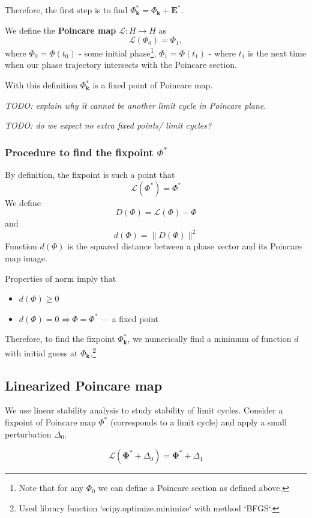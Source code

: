 \documentclass[a4paper,12pt]{article}
\newcommand{\D}{\Delta}%
\begin{document}
Therefore, the first step is to find $\Phi^*_\mathbf{k}=\Phi_\mathbf{k} + \mathbf{E}^*$.

We define the \textbf{Poincare map} $\mathcal{L}: H \rightarrow H$ as
 $$\mathcal{L}(\Phi_0) = \Phi_1,$$
where
$\Phi_0 = \Phi(t_0)$ - some initial phase\footnote{Note that for any $\Phi_0$ we can define a Poincare section as defined above.},
$\Phi_1=\Phi(t_1)$ - where $t_1$ is the next time when our phase trajectory intersects with the Poincare section.

With this definition  $\Phi^*_\mathbf{k}$ is a fixed point of Poincare map.

\textit{TODO: explain why it cannot be another limit cycle in Poincare plane. }

\textit{TODO: do we expect no extra fixed points/ limit cycles?}

\subsubsection{Procedure to find the fixpoint $\Phi^*$}

By definition, the fixpoint is such a point that
$$
\mathcal{L}(\Phi^*) = \Phi^*
$$
We define
$$
D(\Phi) = \mathcal{L}(\Phi) - \Phi
$$
and
$$
d(\Phi) = \lVert D(\Phi) \rVert ^ 2
$$
Function $d(\Phi)$ is the squared distance between a phase vector and its Poincare map image.

Properties of norm imply that
\begin{itemize}
\item $d(\Phi) \geq 0$
\item $d(\Phi)=0 \iff \Phi = \Phi^*$ --- a fixed point

\end{itemize}
Therefore, to find the fixpoint $\Phi^*_{\mathbf{k}}$, we numerically find a minimum of function $d$ with initial guess at $\Phi_{\mathbf{k}}$.\footnote{Used library function `scipy.optimize.minimize` with method `BFGS`.}


\subsection{ Linearized Poincare map}

We use linear stability analysis to study stability of limit cycles. Consider a fixpoint of Poincare map $\Phi^*$ (corresponds to a limit cycle) and apply a small perturbation $\D_0$.

$$\mathcal{L}(\mathbf{\Phi^{*}} + \D_0) = \mathbf{\Phi^{*}} + \D_1$$
\end{document}
